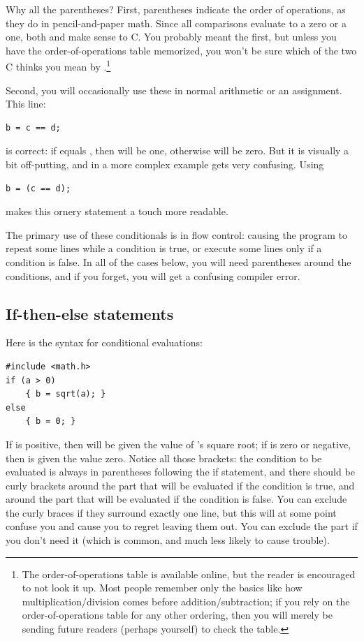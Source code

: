 \documentclass[12pt]{article}
\makeatletter
\def\cindex#1{\index{#1@\ci{#1}}}
\makeatother
\begin{document}
Why all the parentheses? First, parentheses indicate the order of
operations, as they do in pencil-and-paper math. Since all comparisons
evaluate to a zero or a one, both 
and  make sense to C. You probably meant
the first, but unless you have the order-of-operations table memorized,
you won't be sure which of the two C thinks you mean by .\footnote{The order-of-operations table is available
online, but the reader is encouraged to not look it up. Most
people remember only the basics like how multiplication/division comes before
addition/subtraction; if you rely on the order-of-operations table
for any other ordering, then you will merely be sending future readers
(perhaps yourself) to check the table.}

Second, you will occasionally use these in normal arithmetic or an assignment. This line:
\begin{lstlisting}
b = c == d;
\end{lstlisting}
is correct: if  equals , then  will be one, otherwise  will be zero. But
it is visually a bit off-putting, and in a more complex example gets very confusing. Using
\begin{lstlisting}
b = (c == d);
\end{lstlisting}
makes this ornery statement a touch more readable.

The primary use of these conditionals is in flow control: causing
the program to repeat some lines while a condition is true, or execute some lines only if a condition is
false.  In all of the cases below, you will need parentheses around the conditions, and if you forget,
you will get a confusing compiler error.

\subsection{If-then-else statements} Here is the syntax for conditional evaluations: \cindex{if}

\begin{lstlisting}
#include <math.h>
if (a > 0)
    { b = sqrt(a); }
else 
    { b = 0; }
\end{lstlisting}
If  is positive, then  will be given the value of 's square root; if  is
zero or negative, then  is given the value zero. Notice all those brackets: the condition to be
evaluated is always in parentheses following the if statement, and there should be curly brackets around
the part that will be evaluated if the condition is true, and around the part that will be evaluated if
the condition is false. You can exclude the curly braces if they surround exactly one line, but this
will at some point confuse you and cause you to regret leaving them out.
You can exclude the  part if you don't need it (which is
common, and much less likely to cause trouble).
\end{document}
